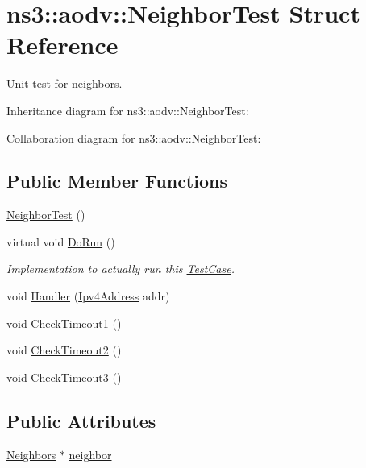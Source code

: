 \hypertarget{structns3_1_1aodv_1_1NeighborTest}{}\section{ns3\+:\+:aodv\+:\+:Neighbor\+Test Struct Reference}
\label{structns3_1_1aodv_1_1NeighborTest}


Unit test for neighbors.  




Inheritance diagram for ns3\+:\+:aodv\+:\+:Neighbor\+Test\+:


Collaboration diagram for ns3\+:\+:aodv\+:\+:Neighbor\+Test\+:
\subsection*{Public Member Functions}
\begin{DoxyCompactItemize}
\item 
\hyperlink{structns3_1_1aodv_1_1NeighborTest_a09187332c7686492165e4fbbe41b6259}{Neighbor\+Test} ()
\item 
virtual void \hyperlink{structns3_1_1aodv_1_1NeighborTest_aeb957b7644d6c77f5d0d43d2c160897f}{Do\+Run} ()
\begin{DoxyCompactList}\small\item\em Implementation to actually run this \hyperlink{classns3_1_1TestCase}{Test\+Case}. \end{DoxyCompactList}\item 
void \hyperlink{structns3_1_1aodv_1_1NeighborTest_aa2ca2238043b82134270dc01c44eb312}{Handler} (\hyperlink{classns3_1_1Ipv4Address}{Ipv4\+Address} addr)
\item 
void \hyperlink{structns3_1_1aodv_1_1NeighborTest_ac1432a9243d8fa9c47f792a4569fc289}{Check\+Timeout1} ()
\item 
void \hyperlink{structns3_1_1aodv_1_1NeighborTest_a0dee47d52dc969ef689f653e7839310d}{Check\+Timeout2} ()
\item 
void \hyperlink{structns3_1_1aodv_1_1NeighborTest_afb410a6df3aa71e1d18b7366fc5ed04b}{Check\+Timeout3} ()
\end{DoxyCompactItemize}
\subsection*{Public Attributes}
\begin{DoxyCompactItemize}
\item 
\hyperlink{classns3_1_1aodv_1_1Neighbors}{Neighbors} $\ast$ \hyperlink{structns3_1_1aodv_1_1NeighborTest_a2679fee1854e68a579322ac5bc2bed94}{neighbor}
\end{DoxyCompactItemize}
